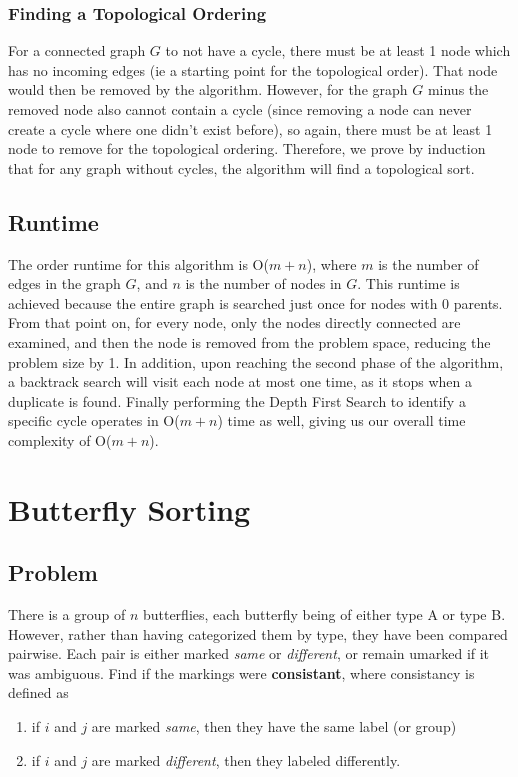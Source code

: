 \documentclass[titlepage]{article}
\numberwithin{equation}{subsection}
\begin{document}
\subsubsection{Finding a Topological Ordering}
For a connected graph $G$ to not have a cycle, there must be at 
least 1 node which has no incoming edges (ie a starting point 
for the topological order). That node would then be removed 
by the algorithm. However, for the graph $G$ minus the 
removed node also cannot contain a cycle (since removing a node
can never create a cycle where one didn't exist before), so again,
there must be at least 1 node to remove for the topological ordering.
Therefore, we prove by induction that for any graph without cycles,
the algorithm will find a topological sort.
\subsection{Runtime}
The order runtime for this algorithm is O($m + n$), where $m$ is the
number of edges in the graph $G$, and $n$ is the number of nodes in $G$.
This runtime is achieved because the entire graph is searched just once
for nodes with 0 parents. From that point on, for every node, only the nodes
directly connected are examined, and then the node is removed from the
problem space, reducing the problem size by 1. In addition, upon reaching
the second phase of the algorithm, a backtrack search will visit each
node at most one time, as it stops when a duplicate is found. Finally
performing the Depth First Search to identify a specific cycle
operates in O($m+n$) time as well, giving us our overall time complexity of
O($m+n$).
\section{Butterfly Sorting}
\subsection{Problem}
There is a group of $n$ butterflies, each butterfly being of either
type A or type B. However, rather than having categorized them by type,
they have been compared pairwise. Each pair is either marked 
\textit{same} or \textit{different}, or remain umarked if it was ambiguous. Find
if the markings were \textbf{consistant}, where consistancy is
defined as
\begin{enumerate}
    \item if $i$ and $j$ are marked \textit{same}, then they have the same label (or group)
    \item if $i$ and $j$ are marked \textit{different}, then they labeled differently.
\end{enumerate}
\end{document}
